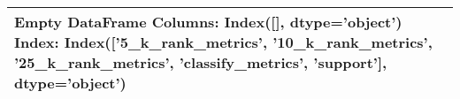 \begin{tabular}{l}
\toprule
Empty DataFrame
Columns: Index([], dtype='object')
Index: Index(['5\_k\_rank\_metrics', '10\_k\_rank\_metrics', '25\_k\_rank\_metrics',
       'classify\_metrics', 'support'],
      dtype='object') \\
\bottomrule
\end{tabular}
